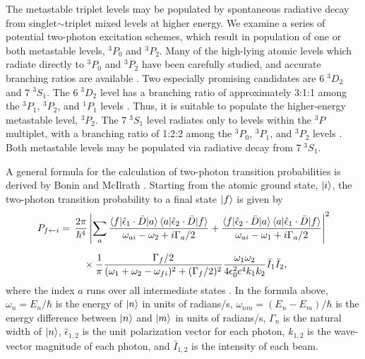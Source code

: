 The metastable triplet levels may be populated by spontaneous radiative
decay from singlet$\sim$triplet mixed levels at higher energy.  We
examine a series of potential two-photon excitation schemes, which
result in population of one or both metastable levels, $^3P_0$ and
$^3P_2$.  Many of the high-lying atomic levels which radiate directly
to $^3P_0$ and $^3P_2$ have been carefully studied, and accurate
branching ratios are available \cite{benck89}.  Two especially
promising candidates are $6 \; ^3D_2$ and $7 \; ^3S_1$.  The $6 \;
^3D_2$ level has a branching ratio of approximately 3:1:1 among the
$^3P_1$, $^3P_2$, and $^1P_1$ levels \cite{benck89}.  Thus, it is
suitable to populate the higher-energy metastable level, $^3P_2$.  The
$7 \; ^3S_1$ level radiates only to levels within the $^3P$ multiplet,
with a branching ratio of 1:2:2 among the $^3P_0$, $^3P_1$, and
$^3P_2$ levels \cite{benck89}.  Both metastable levels may be
populated via radiative decay from $7 \; ^3S_1$.

A general formula for the calculation of two-photon transition
probabilities is derived by Bonin and McIlrath \cite{bonin84}.
Starting from the atomic ground state, $\mathinner{|{i}\rangle}$, the two-photon
transition probability to a final state $\mathinner{|{f}\rangle}$ is given by
\begin{equation}
  \label{eq:tpa-prob}
  \begin{split}
    P_{f \leftarrow i} = &\: \: \frac{2 \pi}{\hbar^4}
    \left \lvert
      \sum_a
      \frac{
        \mathinner{\langle{f|\hat{\epsilon}_1 \cdot \bar{D}|a}\rangle}\mathinner{\langle{a|\hat{\epsilon}_2 \cdot \bar{D}|f}\rangle}
      }{
        \omega_{ai} - \omega_2 + i \Gamma_a / 2
      } + \frac{
        \mathinner{\langle{f|\hat{\epsilon}_2 \cdot \bar{D}|a}\rangle}\mathinner{\langle{a|\hat{\epsilon}_1 \cdot \bar{D}|f}\rangle}
      }{
        \omega_{ai} - \omega_1 + i \Gamma_a / 2
      }
    \right \rvert ^2\\[2mm]
    & \: \: \: \: \: \: \times 
      \frac{1}{\pi} 
      \frac{
        \Gamma_f / 2
      }{
        (\omega_1 + \omega_2 - \omega_{fi})^2+(\Gamma_f/2)^2
      } \frac{
        \omega_1 \omega_2
      }{
        4 \epsilon_0^2 c^4 k_1 k_2
      } \bar{I}_1 \bar{I}_2,\\
  \end{split}
\end{equation}
where the index $a$ runs over all intermediate states \cite{bonin84,
  grynberg77}.  In the formula above, $\omega_n = E_n / \hbar$ is the
energy of $\mathinner{|{n}\rangle}$ in units of radians/s, $\omega_{nm} = (E_n -
E_m)/\hbar$ is the energy difference between $\mathinner{|{n}\rangle}$ and $\mathinner{|{m}\rangle}$
in units of radians/s, $\Gamma_n$ is the natural width of $\mathinner{|{n}\rangle}$,
$\hat{\epsilon}_{1,2}$ is the unit polarization vector for each
photon, $k_{1,2}$ is the wave-vector magnitude of each photon, and
$\bar{I}_{1,2}$ is the intensity of each beam.

